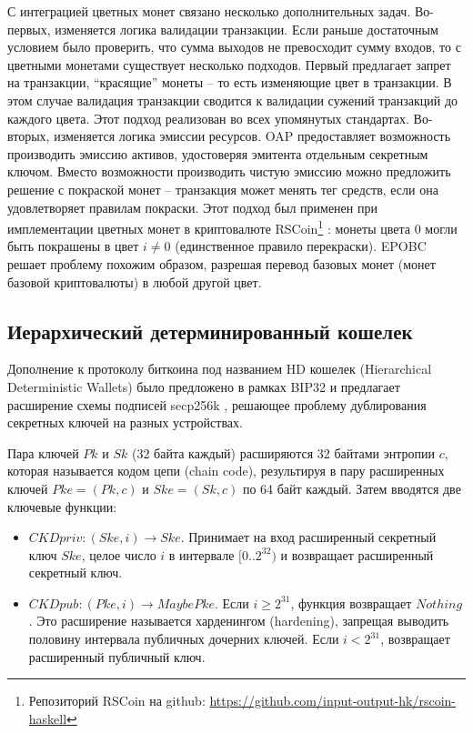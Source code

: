 \documentclass[specification,annotation]{itmo-student-thesis}
\begin{document}
С интеграцией цветных монет связано несколько дополнительных
задач. Во-первых, изменяется логика валидации транзакции. Если раньше
достаточным условием было проверить, что сумма выходов не превосходит
сумму входов, то с цветными монетами существует несколько
подходов. Первый предлагает запрет на транзакции, ``красящие'' монеты
-- то есть изменяющие цвет в транзакции. В этом случае валидация
транзакции сводится к валидации сужений транзакций до каждого
цвета. Этот подход реализован во всех упомянутых
стандартах. Во-вторых, изменяется логика эмиссии ресурсов. OAP
предоставляет возможность производить эмиссию активов, удостоверяя
эмитента отдельным секретным ключом. Вместо возможности производить
чистую эмиссию можно предложить решение с покраской монет --
транзакция может менять тег средств, если она удовлетворяет правилам
покраски. Этот подход был применен при имплементации цветных монет в
криптовалюте RSCoin\footnote{Репозиторий RSCoin на github:
  \url{https://github.com/input-output-hk/rscoin-haskell}}
\cite{danezis2015centrally}: монеты цвета $0$ могли быть покрашены в
цвет $i \neq 0$ (единственное правило перекраски). EPOBC решает
проблему похожим образом, разрешая перевод базовых монет (монет
базовой криптовалюты) в любой другой цвет.

\subsection{Иерархический детерминированный кошелек}

Дополнение к протоколу биткоина под названием HD кошелек (Hierarchical
Deterministic Wallets) было предложено в рамках BIP32 \cite{hdwallets}
и предлагает расширение схемы подписей secp256k \cite{sec20002},
решающее проблему дублирования секретных ключей на разных устройствах.

Пара ключей $Pk$ и $Sk$ (32 байта каждый) расширяются 32 байтами
энтропии $c$, которая называется кодом цепи (chain code), результируя
в пару расширенных ключей $Pke = (Pk, c)$ и $Ske = (Sk, c)$ по 64 байт
каждый. Затем вводятся две ключевые функции:

\begin{itemize}
\item $CKDpriv : (Ske, i) \rightarrow Ske$. Принимает на вход расширенный
  секретный ключ $Ske$, целое число $i$ в интервале $[0..2^{32})$ и
  возвращает расширенный секретный ключ.
\item $CKDpub : (Pke, i) \rightarrow Maybe Pke$. Если $i \geq 2^{31}$, функция
  возвращает $Nothing$. Это расширение называется харденингом
  (hardening), запрещая выводить половину интервала публичных дочерних
  ключей. Если $i < 2^{31}$, возвращает расширенный публичный ключ.
\end{itemize}
\end{document}
